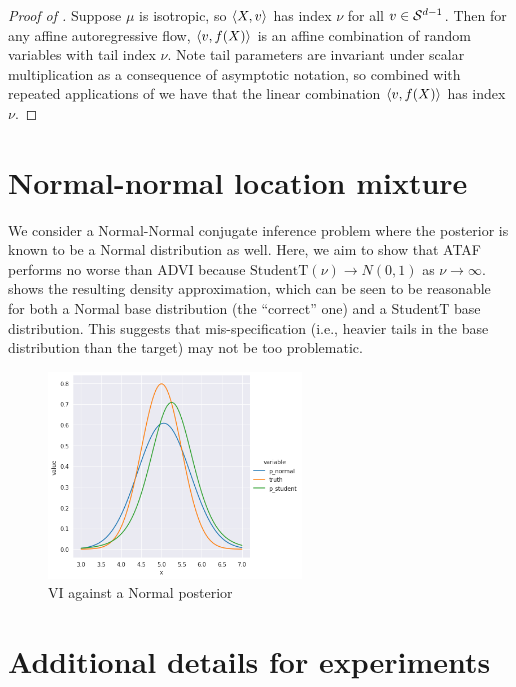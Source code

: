 \documentclass{article}
\theoremstyle{definition}
\theoremstyle{remark}
\begin{document}
\begin{proof}[Proof of ]
  Suppose $\mu$ is isotropic, so $\braket{X,v}$ has index $\nu$ for all $v \in \mathcal{S}^{d-1}$.
  Then for any affine autoregressive flow,
  $\braket{v,f(X)}$ is an affine combination of random variables with tail index $\nu$.
  Note tail parameters are invariant under scalar multiplication as a consequence of
  asymptotic notation, so combined with repeated applications of  we
  have that the linear combination $\braket{v,f(X)}$ has index $\nu$.
\end{proof}


\section{Normal-normal location mixture}
\label{sec:normal-normal-location-mixture}

We consider a Normal-Normal conjugate inference problem where the posterior
is known to be a Normal distribution as well. Here, we aim to show that ATAF
performs no worse than ADVI because $\text{StudentT}(\nu) \to N(0, 1)$ as $\nu \to \infty$.
 shows the resulting density approximation, which can
be seen to be reasonable for both a Normal base distribution (the ``correct'' one)
and a StudentT base distribution. This suggests that mis-specification (i.e., heavier
tails in the base distribution than the target) may not be too problematic.

\begin{figure}[H]
  \centering
  \includegraphics[width=0.6\textwidth]{../Figures/normal_normal_posterior.png}
  \caption{VI against a Normal posterior}
  \label{fig:normal_normal}
\end{figure}


\section{Additional details for experiments}
\label{sec:additional-exp-details}
\end{document}
